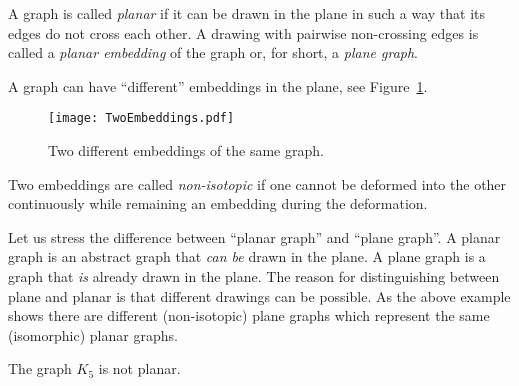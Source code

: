 \begin{page}

\begin{dfn}
A graph is called \emph{planar} if it can be drawn in the plane in such a way that its edges do not cross each other.
A drawing with pairwise non-crossing edges is called a \emph{planar embedding} of the graph or, for short, a \emph{plane graph}.
\end{dfn}

\end{page}

\begin{page}


A graph can have ``different'' embeddings in the plane, see Figure~\ref{fig:TwoEmbeddings}.

\begin{figure}[ht]
\begin{center}
\texttt{[image: TwoEmbeddings.pdf]}
\end{center}
\caption{Two different embeddings of the same graph.}
\label{fig:TwoEmbeddings}
\end{figure}

Two embeddings are called \emph{non-isotopic} if one cannot be deformed into the other continuously
while remaining an embedding during the deformation.


\end{page}

\begin{page}

\begin{rem}
Let us stress the difference between ``planar graph'' and ``plane graph''.
A planar graph is an abstract graph that \emph{can be} drawn in the plane.
A plane graph is a graph that \emph{is} already drawn in the plane.
The reason for distinguishing between plane and planar is that different drawings can be possible.
As the above example shows there are different (non-isotopic) plane graphs which represent the same (isomorphic) planar graphs.
\end{rem}

\end{page}

\begin{page}

\begin{thm}
The graph $K_5$ is not planar.
\end{thm}

\end{page}

